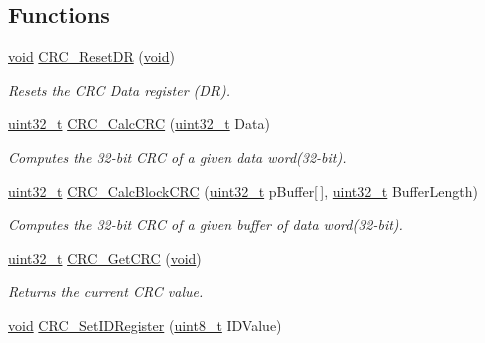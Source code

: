 \subsection*{Functions}
\begin{DoxyCompactItemize}
\item 
\hyperlink{usb__devapi_8h_afabf60e7f57651d6d595a02c75f07cd0}{void} \hyperlink{group___c_r_c___private___functions_ga506467d5ef873a5a4ade4ae83cb110f6}{C\+R\+C\+\_\+\+Reset\+DR} (\hyperlink{usb__devapi_8h_afabf60e7f57651d6d595a02c75f07cd0}{void})
\begin{DoxyCompactList}\small\item\em Resets the C\+RC Data register (DR). \end{DoxyCompactList}\item 
\hyperlink{_p_e___types_8h_a33594304e786b158f3fb30289278f5af}{uint32\+\_\+t} \hyperlink{group___c_r_c___private___functions_ga5407fdbb8e8c9be6322cc8856ae5db3b}{C\+R\+C\+\_\+\+Calc\+C\+RC} (\hyperlink{_p_e___types_8h_a33594304e786b158f3fb30289278f5af}{uint32\+\_\+t} Data)
\begin{DoxyCompactList}\small\item\em Computes the 32-\/bit C\+RC of a given data word(32-\/bit). \end{DoxyCompactList}\item 
\hyperlink{_p_e___types_8h_a33594304e786b158f3fb30289278f5af}{uint32\+\_\+t} \hyperlink{group___c_r_c___private___functions_gab15ebf620615c360048fb4f45b15fae6}{C\+R\+C\+\_\+\+Calc\+Block\+C\+RC} (\hyperlink{_p_e___types_8h_a33594304e786b158f3fb30289278f5af}{uint32\+\_\+t} p\+Buffer\mbox{[}$\,$\mbox{]}, \hyperlink{_p_e___types_8h_a33594304e786b158f3fb30289278f5af}{uint32\+\_\+t} Buffer\+Length)
\begin{DoxyCompactList}\small\item\em Computes the 32-\/bit C\+RC of a given buffer of data word(32-\/bit). \end{DoxyCompactList}\item 
\hyperlink{_p_e___types_8h_a33594304e786b158f3fb30289278f5af}{uint32\+\_\+t} \hyperlink{group___c_r_c___private___functions_gab62db4561b0558f3c8ed53887fe7de8b}{C\+R\+C\+\_\+\+Get\+C\+RC} (\hyperlink{usb__devapi_8h_afabf60e7f57651d6d595a02c75f07cd0}{void})
\begin{DoxyCompactList}\small\item\em Returns the current C\+RC value. \end{DoxyCompactList}\item 
\hyperlink{usb__devapi_8h_afabf60e7f57651d6d595a02c75f07cd0}{void} \hyperlink{group___c_r_c___private___functions_ga769c9a42be57b972ae61bbada0f2e46a}{C\+R\+C\+\_\+\+Set\+I\+D\+Register} (\hyperlink{_p_e___types_8h_aba7bc1797add20fe3efdf37ced1182c5}{uint8\+\_\+t} I\+D\+Value)

\end{DoxyCompactItemize}
